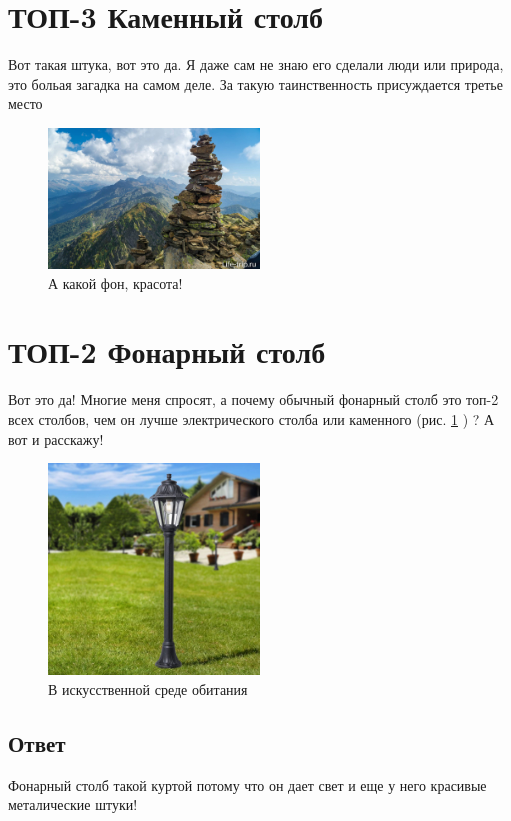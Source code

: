 \documentclass[14pt]{extreport}
\begin{document}
    \section{ТОП-3 Каменный столб}
    Вот такая штука, вот это да. Я даже сам не знаю его сделали люди или природа, это больая загадка на самом деле. За такую таинственность присуждается третье место
        \begin{figure}[h]
                \centering
                \includegraphics[width=0.5\textwidth]{kamenny.jpg}
                \caption{А какой фон, красота!}
                \label{fig:example1}
            \end{figure}
            
    \section{ТОП-2 Фонарный столб}
    Вот это да! Многие меня спросят, а почему обычный фонарный столб это топ-2 всех столбов, чем он лучше электрического столба или каменного (рис. \ref{fig:example1} ) ? А вот и расскажу!
                \begin{figure}[h]
                        \centering
                        \includegraphics[width=0.5\textwidth]{stolbic.jpg}
                        \caption{В искусственной среде обитания}
                        \label{fan}
                    \end{figure}
    \subsection{Ответ}
    Фонарный столб такой куртой потому что он дает свет и еще у него красивые металические штуки!
    
\end{document}
